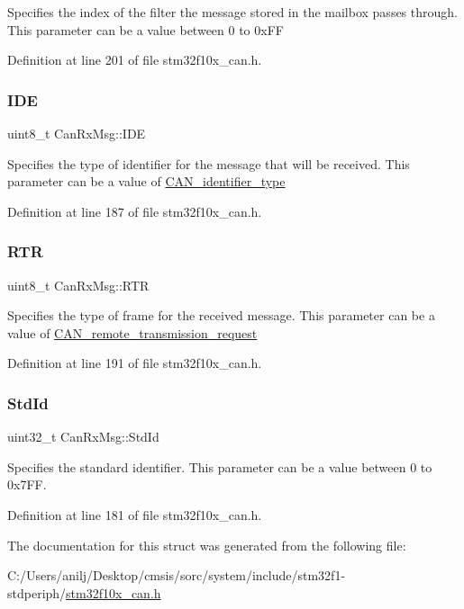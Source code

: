Specifies the index of the filter the message stored in the mailbox passes through. This parameter can be a value between 0 to 0x\+FF 

Definition at line 201 of file stm32f10x\+\_\+can.\+h.

\mbox{\label{struct_can_rx_msg_a83a67d1a709cc01570ce956e5adc811f}} 
\subsubsection{\texorpdfstring{I\+DE}{IDE}}
{\footnotesize\ttfamily uint8\+\_\+t Can\+Rx\+Msg\+::\+I\+DE}

Specifies the type of identifier for the message that will be received. This parameter can be a value of \hyperlink{group___c_a_n__identifier__type}{C\+A\+N\+\_\+identifier\+\_\+type} 

Definition at line 187 of file stm32f10x\+\_\+can.\+h.

\mbox{\label{struct_can_rx_msg_a9a183149a391a24f86da2ce895f0f1c9}} 
\subsubsection{\texorpdfstring{R\+TR}{RTR}}
{\footnotesize\ttfamily uint8\+\_\+t Can\+Rx\+Msg\+::\+R\+TR}

Specifies the type of frame for the received message. This parameter can be a value of \hyperlink{group___c_a_n__remote__transmission__request}{C\+A\+N\+\_\+remote\+\_\+transmission\+\_\+request} 

Definition at line 191 of file stm32f10x\+\_\+can.\+h.

\mbox{\label{struct_can_rx_msg_a62769e18836146f71238bee6b43b531e}} 
\subsubsection{\texorpdfstring{Std\+Id}{StdId}}
{\footnotesize\ttfamily uint32\+\_\+t Can\+Rx\+Msg\+::\+Std\+Id}

Specifies the standard identifier. This parameter can be a value between 0 to 0x7\+FF. 

Definition at line 181 of file stm32f10x\+\_\+can.\+h.



The documentation for this struct was generated from the following file\+:\begin{DoxyCompactItemize}
\item 
C\+:/\+Users/anilj/\+Desktop/cmsis/sorc/system/include/stm32f1-\/stdperiph/\hyperlink{stm32f10x__can_8h}{stm32f10x\+\_\+can.\+h}\end{DoxyCompactItemize}

